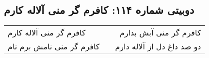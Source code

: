 \begin{center}
\section*{دوبیتی شماره ۱۱۴: کافرم گر منی آلاله کارم}
\label{sec:114}
\begin{longtable}{l p{0.5cm} r}
کافرم گر منی آلاله کارم
&&
کافرم گر منی آبش بدارم
\\
کافرم گر منی نامش برم نام
&&
دو صد داغ دل از آلاله دارم
\\
\end{longtable}
\end{center}
